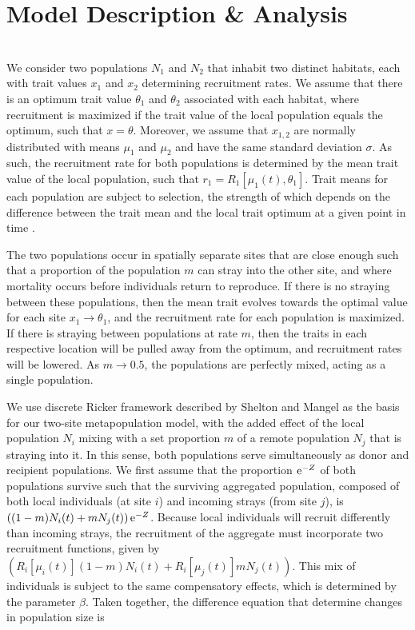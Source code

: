 \documentclass{revtex4}
\begin{document}
\section{Model Description \& Analysis}

\\
\noindent We consider two populations $N_1$ and $N_2$ that inhabit two distinct habitats, each with trait values $x_1$ and $x_2$ determining recruitment rates.
We assume that there is an optimum trait value $\theta_1$ and $\theta_2$ associated with each habitat, where recruitment is maximized if the trait value of the local population equals the optimum, such that $x = \theta$.
Moreover, we assume that $x_{1,2}$ are normally distributed with means $\mu_1$ and $\mu_2$ and have the same standard deviation $\sigma$.
As such, the recruitment rate for both populations is determined by the mean trait value of the local population, such that $r_1 = R_1[\mu_1(t),\theta_1]$.
Trait means for each population are subject to selection, the strength of which depends on the difference between the trait mean and the local trait optimum at a given point in time \citep{simpson1953major,Lande:1976ga}.

The two populations occur in spatially separate sites that are close enough such that a proportion of the population $m$ can stray into the other site, and where mortality occurs before individuals return to reproduce.
If there is no straying between these populations, then the mean trait evolves towards the optimal value for each site $x_1 \rightarrow \theta_1$, and the recruitment rate for each population is maximized.
If there is straying between populations at rate $m$, then the traits in each respective location will be pulled away from the optimum, and recruitment rates will be lowered.
As $m \rightarrow 0.5$, the populations are perfectly mixed, acting as a single population.


We use discrete Ricker framework described by Shelton and Mangel \citep{Shelton:2011eq} as the basis for our two-site metapopulation model, with the added effect of the local population $N_i$ mixing with a set proportion $m$ of a remote population $N_j$ that is straying into it.
In this sense, both populations serve simultaneously as donor and recipient populations.
We first assume that the proportion ${\rm e}^{-Z}$ of both populations survive such that the surviving aggregated population, composed of both local individuals (at site $i$) and incoming strays (from site $j$), is $\left((1-m)N_i(t) + m N_j(t) \right){\rm e}^{-Z}$.
Because local individuals will recruit differently than incoming strays, the recruitment of the aggregate must incorporate two recruitment functions, given by $\left(R_i[\mu_i(t)] (1-m)N_i(t) + R_i[\mu_j(t)] m N_j(t)\right)$.
This mix of individuals is subject to the same compensatory effects, which is determined by the parameter $\beta$.
Taken together, the difference equation that determine changes in population size is
\end{document}
